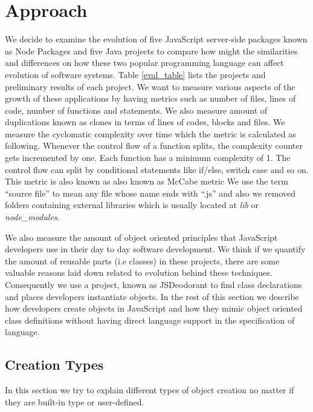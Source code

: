 \documentclass[conference]{IEEEtran}
\newcommand{\duptype}[1]{
	\vspace{6pt}
	\noindent
	\ovalbox{
		\begin{minipage}{8cm}
			#1
		\end{minipage}
	}
	\vspace{4pt}   
}
\begin{document}
	
	\section{Approach}
	\label{sec:approach}
We decide to examine the evolution of five JavaScript server-side packages known as Node Packages and five Java projects to compare how might the similarities and differences on how these two popular programming language can affect evolution of software systems.  Table \ref{eval_table} lists the projects and preliminary results of each project.
We want to measure various aspects of the growth of these applications by having metrics such as number of files, lines of code, number of functions and statements. We also measure amount of duplications known as clones in terms of lines of codes, blocks and files. We measure the cyclomatic complexity over time which the metric is calculated as following. Whenever the control flow of a function splits, the complexity counter gets incremented by one. Each function has a minimum complexity of 1. The control flow can split by conditional statements like if/else, switch case and so on. This metric is also known as also known as McCabe metric
We use the term “source file” to mean any file whose name ends with “.js” and also we removed folders containing external libraries which is usually located at \textit{lib} or \textit{node\_modules}. 

\par We also measure the amount of object oriented principles that JavaScript developers use in their day to day software development. We think if we quantify the amount of reusable parts (i.e classes) in these projects, there are some valuable reasons laid down related to evolution behind these techniques. Consequently we use a project, known as JSDeodorant to find class declarations and places developers instantiate objects.
In the rest of this section we describe how developers create objects in JavaScript and how they mimic object oriented class definitions without having direct language support in the specification of language.


\subsection{Creation Types}
In this section we try to explain different types of object creation no matter if they are built-in type or user-defined. 

\duptype{\textbf{Type I}: \textit{Array Literal Expression}.}
\end{document}
